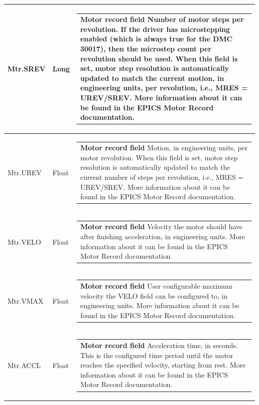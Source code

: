 \documentclass[openany]{article}
\begin{document}
\begin{longtable}{| m{4.5cm} m{2.5cm}  m{8.5cm} |}
        Mtr.SREV & Long & \begin{tabular}{@{}m{6cm}@{}}
                \textbf{\color{ForestGreen} Motor record field} Number of motor steps per revolution. If the driver has microstepping enabled (which is always true for the DMC 30017), then the microstep count per revolution should be used. When this field is set, motor step resolution is automatically updated to match the current motion, in engineering units, per revolution, i.e., MRES = UREV/SREV. More information about it can be found in the EPICS Motor Record documentation.
            \end{tabular} \hypertarget{pv:mtr-urev}{}\\ \hline
        Mtr.UREV & Float & \begin{tabular}{@{}m{6cm}@{}}
                \textbf{\color{ForestGreen} Motor record field} Motion, in engineering units, per motor revolution. When this field is set, motor step resolution is automatically updated to match the current number of steps per revolution, i.e., MRES = UREV/SREV. More information about it can be found in the EPICS Motor Record documentation.
            \end{tabular} \hypertarget{pv:mtr-velo}{}\\ \hline
        Mtr.VELO & Float & \begin{tabular}{@{}m{6cm}@{}}
                \textbf{\color{ForestGreen} Motor record field} Velocity the motor should have after finishing acceleration, in engineering units. More information about it can be found in the EPICS Motor Record documentation.
            \end{tabular} \hypertarget{pv:mtr-vmax}{}\\ \hline
        Mtr.VMAX & Float & \begin{tabular}{@{}m{6cm}@{}}
                \textbf{\color{ForestGreen} Motor record field} User configurable maximum velocity the VELO field can be configured to, in engineering units. More information about it can be found in the EPICS Motor Record documentation.
            \end{tabular} \hypertarget{pv:mtr-accl}{}\\ \hline
        Mtr.ACCL & Float & \begin{tabular}{@{}m{6cm}@{}}
                \textbf{\color{ForestGreen} Motor record field} Acceleration time, in seconds. This is the configured time period until the motor reaches the specified velocity, starting from rest. More information about it can be found in the EPICS Motor Record documentation.

\end{tabular}
\end{longtable}
\end{document}
